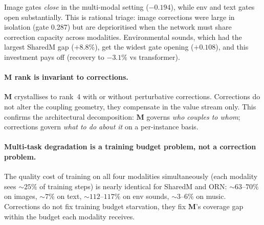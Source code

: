 \documentclass[11pt, a4paper]{article}
\newcommand{\M}{\mathbf{M}}
\theoremstyle{plain}
\theoremstyle{remark}
\begin{document}
Image gates \emph{close} in the multi-modal setting ($-0.194$), while env and text gates open substantially.
This is rational triage: image corrections were large in isolation (gate 0.287) but are deprioritised when the network must share correction capacity across modalities.
Environmental sounds, which had the largest SharedM gap ($+8.8\%$), get the widest gate opening ($+0.108$), and this investment pays off (recovery to $-3.1\%$ vs transformer).

\paragraph{M rank is invariant to corrections.}
$\M$ crystallises to rank~4 with or without perturbative corrections.
Corrections do not alter the coupling geometry, they compensate in the value stream only.
This confirms the architectural decomposition: $\M$ governs \emph{who couples to whom}; corrections govern \emph{what to do about it} on a per-instance basis.

\paragraph{Multi-task degradation is a training budget problem, not a correction problem.}
The quality cost of training on all four modalities simultaneously (each modality sees ${\sim}25\%$ of training steps) is nearly identical for SharedM and ORN: ${\sim}63$--$70\%$ on images, ${\sim}7\%$ on text, ${\sim}112$--$117\%$ on env sounds, ${\sim}3$--$6\%$ on music.
Corrections do not fix training budget starvation, they fix $\M$'s coverage gap within the budget each modality receives.
\end{document}
